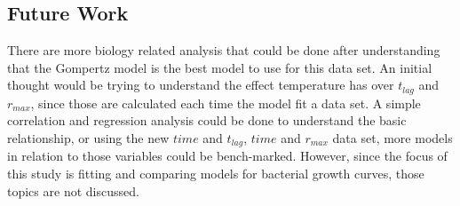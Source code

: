 \documentclass[11pt]{article}
\begin{document}
\subsection{Future Work}
There are more biology related analysis that could be done after understanding that the Gompertz model is the best model to use for this data set. An initial thought would be trying to understand the effect temperature has over $t_{lag}$ and $r_{max}$, since those are calculated each time the model fit a data set. A simple correlation and regression analysis could be done to understand the basic relationship, or using the new $time$ and $t_{lag}$, $time$ and $r_{max}$ data set, more models in relation to those variables could be bench-marked. However, since the focus of this study is fitting and comparing models for bacterial growth curves, those topics are not discussed.
\clearpage

\printbibliography
\end{document}
